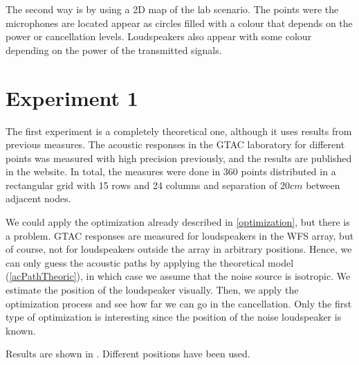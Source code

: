The second way is by using a 2D map of the lab scenario. The points were the microphones are located appear as circles filled with a colour that depends on the power or cancellation levels. Loudspeakers also appear with some colour depending on the power of the transmitted signals.

\section{Experiment 1}
The first experiment is a completely theoretical one, although it uses results from previous measures. The acoustic responses in the GTAC laboratory for different points was measured with high precision previously, and the results are published in the website. In total, the measures were done in 360 points distributed in a rectangular grid with 15 rows and 24 columns and separation of $20 \si{cm}$ between adjacent nodes.

We could apply the optimization already described in \autoref{optimization}, but there is a problem. GTAC responses are measured for loudspeakers in the WFS array, but of course, not for loudspeakers outside the array in arbitrary positions. Hence, we can only guess the acoustic paths by applying the theoretical model (\autoref{acPathTheoric}), in which case we assume that the noise source is isotropic. We estimate the position of the loudspeaker visually. Then, we apply the optimization process and see how far we can go in the cancellation. Only the first type of optimization is interesting since the position of the noise loudspeaker is known.

Results are shown in . Different positions have been used.






